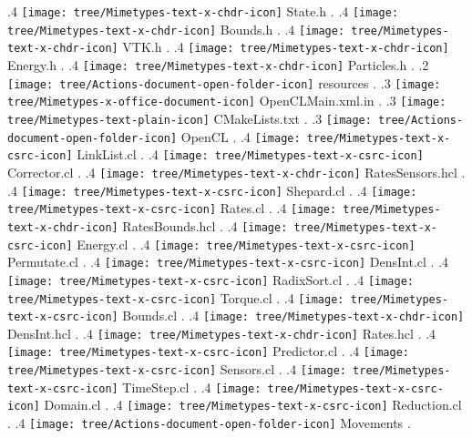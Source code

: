 {.4 { \texttt{[image: tree/Mimetypes-text-x-chdr-icon]} State.h }.
.4 { \texttt{[image: tree/Mimetypes-text-x-chdr-icon]} Bounds.h }.
.4 { \texttt{[image: tree/Mimetypes-text-x-chdr-icon]} VTK.h }.
.4 { \texttt{[image: tree/Mimetypes-text-x-chdr-icon]} Energy.h }.
.4 { \texttt{[image: tree/Mimetypes-text-x-chdr-icon]} Particles.h }.
.2 { \texttt{[image: tree/Actions-document-open-folder-icon]} resources }.
.3 { \texttt{[image: tree/Mimetypes-x-office-document-icon]} OpenCLMain.xml.in }.
.3 { \texttt{[image: tree/Mimetypes-text-plain-icon]} CMakeLists.txt }.
.3 { \texttt{[image: tree/Actions-document-open-folder-icon]} OpenCL }.
.4 { \texttt{[image: tree/Mimetypes-text-x-csrc-icon]} LinkList.cl }.
.4 { \texttt{[image: tree/Mimetypes-text-x-csrc-icon]} Corrector.cl }.
.4 { \texttt{[image: tree/Mimetypes-text-x-chdr-icon]} RatesSensors.hcl }.
.4 { \texttt{[image: tree/Mimetypes-text-x-csrc-icon]} Shepard.cl }.
.4 { \texttt{[image: tree/Mimetypes-text-x-csrc-icon]} Rates.cl }.
.4 { \texttt{[image: tree/Mimetypes-text-x-chdr-icon]} RatesBounds.hcl }.
.4 { \texttt{[image: tree/Mimetypes-text-x-csrc-icon]} Energy.cl }.
.4 { \texttt{[image: tree/Mimetypes-text-x-csrc-icon]} Permutate.cl }.
.4 { \texttt{[image: tree/Mimetypes-text-x-csrc-icon]} DensInt.cl }.
.4 { \texttt{[image: tree/Mimetypes-text-x-csrc-icon]} RadixSort.cl }.
.4 { \texttt{[image: tree/Mimetypes-text-x-csrc-icon]} Torque.cl }.
.4 { \texttt{[image: tree/Mimetypes-text-x-csrc-icon]} Bounds.cl }.
.4 { \texttt{[image: tree/Mimetypes-text-x-chdr-icon]} DensInt.hcl }.
.4 { \texttt{[image: tree/Mimetypes-text-x-chdr-icon]} Rates.hcl }.
.4 { \texttt{[image: tree/Mimetypes-text-x-csrc-icon]} Predictor.cl }.
.4 { \texttt{[image: tree/Mimetypes-text-x-csrc-icon]} Sensors.cl }.
.4 { \texttt{[image: tree/Mimetypes-text-x-csrc-icon]} TimeStep.cl }.
.4 { \texttt{[image: tree/Mimetypes-text-x-csrc-icon]} Domain.cl }.
.4 { \texttt{[image: tree/Mimetypes-text-x-csrc-icon]} Reduction.cl }.
.4 { \texttt{[image: tree/Actions-document-open-folder-icon]} Movements }.
}
